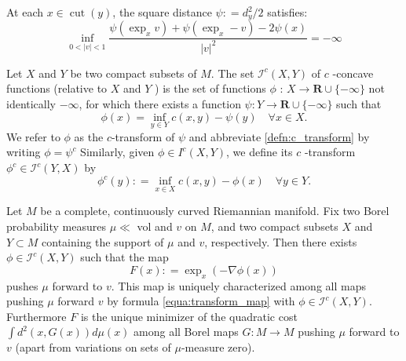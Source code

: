 \begin{prop}
	\label{prop:distance_cut_locus}
	At each \( x \in \operatorname { cut } ( y ) \), the square distance \( \psi : = d _ { y } ^ { 2 } / 2 \) satisfies:
	\[ \inf _ { 0 < | v | < 1 } \frac { \psi \left( \exp _ { x } v \right) + \psi \left( \exp _ { x } - v \right) - 2 \psi ( x ) } { | v | ^ { 2 } } = - \infty \]
\end{prop}
\begin{defn} 
	Let \( X \) and \( Y \) be two compact subsets of \( M \). The set \( \mathcal{I} ^ { c } ( X , Y ) \) of \( c \) -concave functions (relative to \( X \) and \( Y \) ) is the set of functions \( \phi \) : \( X \rightarrow \mathbf { R } \cup \{ - \infty \} \) not identically \( - \infty \), for which there exists a function \( \psi : Y \rightarrow \mathbf { R } \cup \{ - \infty \} \) such that
	\begin{equation}
		\label{defn:c_transform}
		\phi ( x ) = \inf _ { y \in Y } c ( x , y ) - \psi ( y ) \quad \forall x \in X.
	\end{equation}
	We refer to \( \phi \) as the \( c \)-transform of \( \psi \) and abbreviate \cref{defn:c_transform} by writing \( \phi = \psi ^ { c } \)
	Similarly, given \( \phi \in I ^ { c } ( X , Y ) \), we define its \( c \) -transform \( \phi ^ { c } \in \mathcal{I} ^ { c } ( Y , X ) \) by
	\[ \phi ^ { c } ( y ) : = \inf _ { x \in X } c ( x , y ) - \phi ( x ) \quad \forall y \in Y. \]
\end{defn}

\begin{thm}
	\label{thm:optimal_transport_manifold}
	Let \( M \) be a complete, continuously curved Riemannian manifold. Fix two Borel probability measures \( \mu \ll \) vol and \( v \) on \( M \), and two compact subsets \( X \) and \( Y \subset M \) containing the support of \( \mu \) and \( v \), respectively. Then there exists \( \phi \in \mathcal { I } ^ { c } ( X , Y ) \) such that the map
	\begin{equation}
		\label{equa:transform_map}
		F ( x ) : = \exp _ { x } ( - \nabla \phi ( x ) )
	\end{equation}
	pushes \( \mu \) forward to \( v \). This map is uniquely characterized among all maps pushing \( \mu \) forward \( v \) by formula \cref{equa:transform_map} with \( \phi \in \mathcal{I} ^ { c } ( X , Y ) . \) Furthermore \( F \) is the unique minimizer of the quadratic cost \( \int d ^ { 2 } ( x , G ( x ) ) d \mu ( x ) \) among all Borel maps \( G : M \rightarrow M \) pushing \( \mu \) forward to \( v \) (apart from variations on sets of \( \mu \)-measure zero).
\end{thm}

